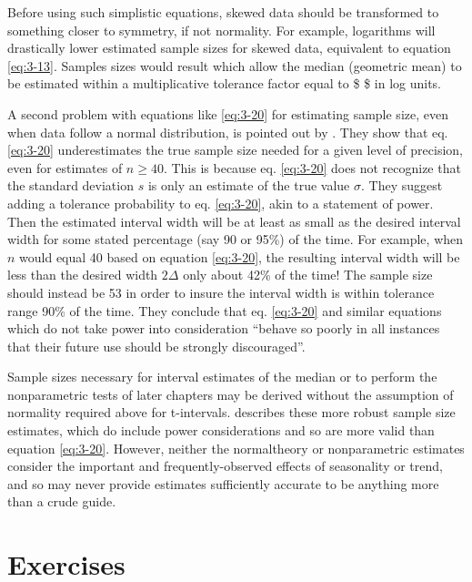 \documentclass[]{book}
\begin{document}
Before using such simplistic equations, skewed data should be transformed to something closer to symmetry, if not normality. For example, logarithms will drastically lower estimated sample sizes for skewed data, equivalent to equation \eqref{eq:3-13}. Samples sizes would result which allow the median (geometric mean) to be estimated within a multiplicative tolerance factor equal to \$  \Delta\$ in log units.

A second problem with equations like \eqref{eq:3-20} for estimating sample size, even when data follow a normal distribution, is pointed out by \citet{kupper_appropriate_1989}. They show that eq. \eqref{eq:3-20} underestimates the true sample size needed for a given level of precision, even for estimates of \(n \geq 40\). This is because eq. \eqref{eq:3-20} does not recognize that the standard deviation \(s\) is only an estimate of the true value \(\sigma\). They suggest adding a tolerance probability to eq. \eqref{eq:3-20}, akin to a statement of power. Then the estimated interval width will be at least as small as the desired interval width for some stated percentage (say 90 or 95\%) of the time. For example, when \(n\) would equal 40 based on equation \eqref{eq:3-20}, the resulting interval width will be less than the desired width \(2 \Delta\) only about 42\% of the time! The sample size should instead be 53 in order to insure the interval width is within tolerance range 90\% of the time. They conclude that eq. \eqref{eq:3-20} and similar equations which do not take power into consideration ``behave so poorly in all instances that their future use should be strongly discouraged''.

Sample sizes necessary for interval estimates of the median or to perform the nonparametric tests of later chapters may be derived without the assumption of normality required above for t-intervals. \citet{noether_sample_1987} describes these more robust sample size estimates, which do include power considerations and so are more valid than equation \eqref{eq:3-20}. However, neither the normaltheory or nonparametric estimates consider the important and frequently-observed effects of seasonality or trend, and so may never provide estimates sufficiently accurate to be anything more than a crude guide.

\hypertarget{exercises-2}{%
\section*{Exercises}\label{exercises-2}}
\end{document}
